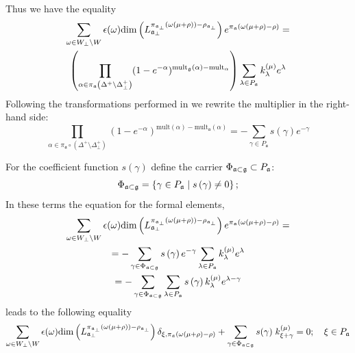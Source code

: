\documentclass[a4paper,12pt]{article}
\theoremstyle{definition} \newtheorem{Def}{Definition}
\begin{document}
Thus we have the equality
\begin{multline}
  \label{eq:9}
  \sum_{\omega\in W_{\bot}\backslash W} \epsilon(\omega) \mathrm{dim}\left(L^{\pi_{\mathfrak{a}_{\bot}}(\omega(\mu+\rho))-\rho_{\mathfrak{a}_{\bot}}}_{\mathfrak{a}_{\bot}}\right) e^{\pi_{\mathfrak{a}}(\omega(\mu+\rho)-\rho)}=\\
  \left(\prod_{\alpha\in \pi_{\mathfrak{a}}\left(\Delta^{+}\setminus \Delta^{+}_{\bot}\right)}(1-e^{-\alpha})^{{\rm mult}_{\mathfrak{g}}(\alpha)-{\rm mult}_{\mathfrak{\alpha}}} \right)
  \sum_{\lambda \in P_{\frak{a}}}k_{\lambda}^{\left( \mu \right) }e^{\lambda }
\end{multline}
Following the transformations performed in \cite{ilyin812pbc} we rewrite the multiplier in the right-hand side:
\begin{equation}
  \label{eq:11}
    \prod_{\alpha\in \pi_{\mathfrak{a}}\circ (\Delta^{+}\setminus \Delta^{+}_{\bot})} \left(1-e^{-\alpha}\right)^{\mathrm{mult}(\alpha)-\mathrm{mult}_{\mathfrak{a}}(\alpha)}=
     -\sum_{\gamma\in P_{\mathfrak{a}}} s(\gamma)e^{-\gamma}
\end{equation}

For the coefficient function $s\left( \gamma \right) $ define the carrier $\Phi _{\frak{a%
}\subset \frak{g}}\subset P_{\frak{a}}$:
\begin{equation}
\Phi _{\frak{a}\subset \frak{g}}=\left\{ \gamma \in P_{\frak{a}}\mid s\left(
\gamma \right) \neq 0\right\} ;  \label{phi-d}
\end{equation}
In these terms the equation for the formal elements,
\begin{multline}
  \label{eq:16}
  \sum_{\omega\in W_{\bot}\backslash W} \epsilon(\omega) \mathrm{dim}\left(L^{\pi_{\mathfrak{a}_{\bot}}(\omega(\mu+\rho))-\rho_{\mathfrak{a}_{\bot}}}_{\mathfrak{a}_{\bot}}\right) e^{\pi_{\mathfrak{a}}(\omega(\mu+\rho)-\rho)}=\\
  = -\sum_{\gamma \in \Phi _{\frak{a}\subset \frak{g}}} s\left( \gamma \right) e^{-\gamma }\sum_{\lambda \in P_{\frak{a}}}
  k_{\lambda }^{\left( \mu \right) }e^{\lambda } \\
  =-\sum_{\gamma \in \Phi _{\frak{a}\subset \frak{g}}}\sum_{\lambda \in P_{\frak{a}}}s\left( \gamma \right) k_{\lambda }^{\left( \mu \right)}e^{\lambda -\gamma }
\end{multline}
leads to the following equality 
\begin{equation}
  \label{eq:17}
   \sum_{\omega\in W_{\bot}\backslash W} \epsilon(\omega) \mathrm{dim}\left(L^{\pi_{\mathfrak{a}_{\bot}}(\omega(\mu+\rho))-\rho_{\mathfrak{a}_{\bot}}}_{\mathfrak{a}_{\bot}}\right) \delta_{\xi,\pi_{\mathfrak{a}}(\omega(\mu+\rho)-\rho)}+
   \sum_{\gamma \in \Phi _{\frak{a}\subset \frak{g}}} s(\gamma)\; k^{(\mu)}_{\xi+\gamma}=0;\quad \xi\in P_{\mathfrak{a}}
\end{equation}
\end{document}
